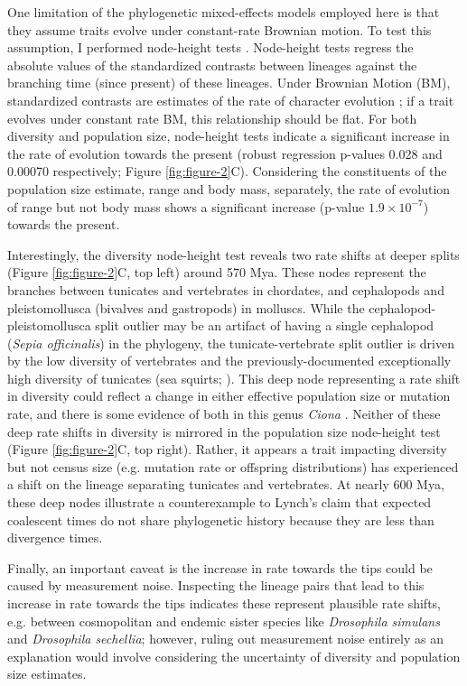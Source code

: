 \documentclass[11pt]{article}
\begin{document}
One limitation of the phylogenetic mixed-effects models employed here is that
they assume traits evolve under constant-rate Brownian motion. To test this
assumption, I performed node-height tests \parencite{Freckleton2006-ww}.
Node-height tests regress the absolute values of the standardized contrasts
between lineages against the branching time (since present) of these lineages.
Under Brownian Motion (BM), standardized contrasts are estimates of the rate of
character evolution \parencite{Felsenstein1985-an}; if a trait evolves under
constant rate BM, this relationship should be flat. For both diversity and
population size, node-height tests indicate a significant increase in the rate
of evolution towards the present (robust regression p-values 0.028 and 0.00070
respectively; Figure \ref{fig:figure-2}C).  Considering the constituents of the
population size estimate, range and body mass, separately, the rate of
evolution of range but not body mass shows a significant increase (p-value $1.9
\times 10^{-7}$) towards the present. 

Interestingly, the diversity node-height test reveals two rate shifts at deeper
splits (Figure \ref{fig:figure-2}C, top left) around 570 Mya. These nodes
represent the branches between tunicates and vertebrates in chordates, and
cephalopods and pleistomollusca (bivalves and gastropods) in molluscs.  While
the cephalopod-pleistomollusca split outlier may be an artifact of having a
single cephalopod (\emph{Sepia officinalis}) in the phylogeny, the
tunicate-vertebrate split outlier is driven by the low diversity of vertebrates
and the previously-documented exceptionally high diversity of tunicates (sea
squirts; \cite{Nydam2010-kg,Small2007-mt}). This deep node representing a rate
shift in diversity could reflect a change in either effective population size
or mutation rate, and there is some evidence of both in this genus \emph{Ciona}
\parencite{Small2007-mt,Tsagkogeorga2012-lv}. Neither of these deep rate shifts
in diversity is mirrored in the population size node-height test (Figure
\ref{fig:figure-2}C, top right). Rather, it appears a trait impacting diversity
but not census size (e.g. mutation rate or offspring distributions) has
experienced a shift on the lineage separating tunicates and vertebrates. At
nearly 600 Mya, these deep nodes illustrate a counterexample to Lynch's claim
that expected coalescent times do not share phylogenetic history because they
are less than divergence times. 

Finally, an important caveat is the increase in rate towards the tips could be
caused by measurement noise. Inspecting the lineage pairs that lead to this
increase in rate towards the tips indicates these represent plausible rate
shifts, e.g. between cosmopolitan and endemic sister species like
\emph{Drosophila simulans} and \emph{Drosophila sechellia}; however, ruling out
measurement noise entirely as an explanation would involve considering the
uncertainty of diversity and population size estimates.
\end{document}

